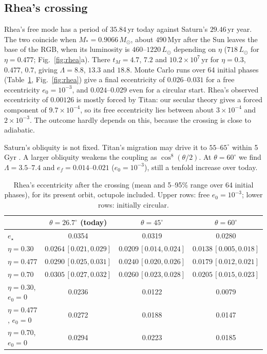 \documentclass[11pt,a4paper]{article}
\newcommand{\estar}{e_\star}
\newcommand{\msun}{M_\odot}
\begin{document}
\subsection{Rhea's crossing}

Rhea's free mode has a period of $35.84$\,yr today against Saturn's $29.46$\,yr year. The two coincide when $M_\ast=0.9066\,\msun$, about $490$\,Myr after the Sun leaves the base of the RGB, when its luminosity is $460$--$1220\,L_\odot$ depending on $\eta$ ($718\,L_\odot$ for $\eta=0.477$; Fig.~\ref{fig:rhea}a). There $t_M=4.7$, $7.2$ and $10.2\times10^7$\,yr for $\eta=0.3$, $0.477$, $0.7$, giving $\Lambda=8.8$, $13.3$ and $18.8$. Monte Carlo runs over 64 initial phases (Table~\ref{tab:rhea}, Fig.~\ref{fig:rhea}) give a final eccentricity of $0.026$--$0.031$ for a free eccentricity $e_0=10^{-3}$, and $0.024$--$0.029$ even for a circular start. Rhea's observed eccentricity of $0.00126$ is mostly forced by Titan: our secular theory gives a forced component of $9.7\times10^{-4}$, so its free eccentricity lies between about $3\times10^{-4}$ and $2\times10^{-3}$. The outcome hardly depends on this, because the crossing is close to adiabatic.

Saturn's obliquity is not fixed. Titan's migration may drive it to $55$--$65^\circ$ within 5\,Gyr \citep{Saillenfest2021a,Saillenfest2021b}. A larger obliquity weakens the coupling as $\cos^8(\theta/2)$. At $\theta=60^\circ$ we find $\Lambda=3.5$--$7.4$ and $e_f=0.014$--$0.021$ ($e_0=10^{-3}$), still a tenfold increase over today.

\begin{table}[t]
\centering
\caption{Rhea's eccentricity after the crossing (mean and 5--95\% range over 64 initial phases), for its present orbit, octupole included. Upper rows: free $e_0=10^{-3}$; lower rows: initially circular.}
\label{tab:rhea}
\begin{tabular}{lccc}
\toprule
 & $\theta=26.7^\circ$ (today) & $\theta=45^\circ$ & $\theta=60^\circ$ \\
\midrule
$\estar$ & 0.0354 & 0.0319 & 0.0280 \\
$\eta=0.30$  & $0.0264\,[0.021,0.029]$ & $0.0209\,[0.014,0.024]$ & $0.0138\,[0.005,0.018]$ \\
$\eta=0.477$ & $0.0290\,[0.025,0.031]$ & $0.0240\,[0.020,0.026]$ & $0.0179\,[0.012,0.021]$ \\
$\eta=0.70$  & $0.0305\,[0.027,0.032]$ & $0.0260\,[0.023,0.028]$ & $0.0205\,[0.015,0.023]$ \\
\midrule
$\eta=0.30$, $e_0=0$  & 0.0236 & 0.0122 & 0.0079 \\
$\eta=0.477$, $e_0=0$ & 0.0272 & 0.0188 & 0.0147 \\
$\eta=0.70$, $e_0=0$  & 0.0294 & 0.0223 & 0.0185 \\
\bottomrule
\end{tabular}
\end{table}
\end{document}
